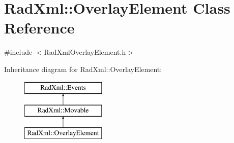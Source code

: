 \hypertarget{class_rad_xml_1_1_overlay_element}{\section{Rad\-Xml\-:\-:Overlay\-Element Class Reference}
\label{class_rad_xml_1_1_overlay_element}
}


{\ttfamily \#include $<$Rad\-Xml\-Overlay\-Element.\-h$>$}

Inheritance diagram for Rad\-Xml\-:\-:Overlay\-Element\-:\begin{figure}[H]
\begin{center}
\leavevmode
\includegraphics[height=3.000000cm]{class_rad_xml_1_1_overlay_element}
\end{center}
\end{figure}
